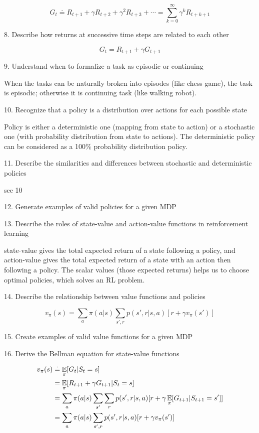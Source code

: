 \documentclass[sutton_barto_notes.tex]{subfiles}
\begin{document}
$$ G_t \doteq R_{t+1} + \gamma R_{t+2} + \gamma^2 R_{t+3} + \cdots = \sum_{k=0}^{\infty} \gamma^k R_{t+k+1} $$

8. Describe how returns at successive time steps are related to each other

$$ G_t = R_{t+1} + \gamma G_{t+1} $$

9. Understand when to formalize a task as episodic or continuing

When the tasks can be naturally broken into episodes (like chess game), the task is episodic; otherwise it is continuing task (like walking robot).

10. Recognize that a policy is a distribution over actions for each possible state

Policy is either a deterministic one (mapping from state to action) or a stochastic one (with probability distribution from state to actions).
The deterministic policy can be considered as a 100\% probability distribution policy.

11. Describe the similarities and differences between stochastic and deterministic policies

see 10

12. Generate examples of valid policies for a given MDP

13. Describe the roles of state-value and action-value functions in reinforcement learning

state-value gives the total expected return of a state following a policy, and action-value gives the total expected return of a state with an action then following a policy.
The scalar values (those expected returns) helps us to choose optimal policies, which solves an RL problem.

14. Describe the relationship between value functions and policies

$$v_\pi (s) = \sum_a \pi (a|s) \sum_{s',r} p(s',r|s,a)[r+\gamma v_\pi(s')] $$

15. Create examples of valid value functions for a given MDP

16. Derive the Bellman equation for state-value functions

\begin{align*}
v_\pi(s) & \doteq \operatorname*{\mathbb{E}}_\pi[G_t | S_t = s]\\
& = \operatorname*{\mathbb{E}}_\pi[R_{t+1} + \gamma G_{t+1} | S_t = s]\\
& = \sum_a \pi(a|s) \sum_{s'}\sum_r p(s',r|s,a) [r+ \gamma \operatorname*{\mathbb{E}}_\pi[G_{t+1} | S_{t+1}=s']]\\
& = \sum_a \pi(a|s) \sum_{s',r} p(s',r|s,a) [r+ \gamma v_\pi(s')]
\end{align*}
\end{document}
